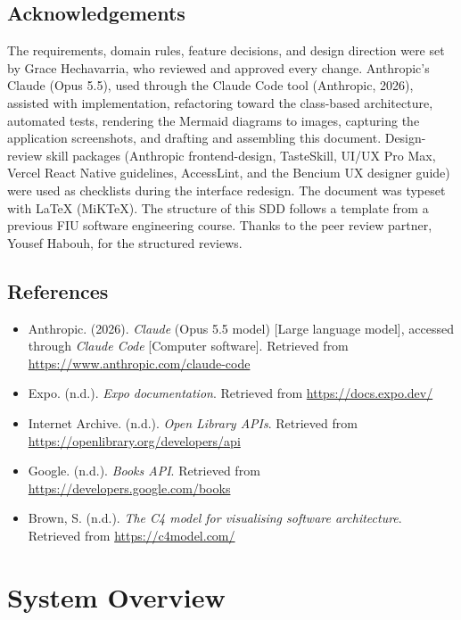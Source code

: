 \documentclass[12pt]{article}
\begin{document}
\subsection{Acknowledgements}

The requirements, domain rules, feature decisions, and design direction were set by Grace Hechavarria, who reviewed and approved every change. Anthropic's Claude (Opus 5.5), used through the Claude Code tool (Anthropic, 2026), assisted with implementation, refactoring toward the class-based architecture, automated tests, rendering the Mermaid diagrams to images, capturing the application screenshots, and drafting and assembling this document. Design-review skill packages (Anthropic frontend-design, TasteSkill, UI/UX Pro Max, Vercel React Native guidelines, AccessLint, and the Bencium UX designer guide) were used as checklists during the interface redesign. The document was typeset with \LaTeX{} (MiKTeX). The structure of this SDD follows a template from a previous FIU software engineering course. Thanks to the peer review partner, Yousef Habouh, for the structured reviews.

\subsection{References}

\begin{itemize}[leftmargin=0.5in, itemindent=-0.5in, labelsep=0in]
\item Anthropic. (2026). \textit{Claude} (Opus 5.5 model) [Large language model], accessed through \textit{Claude Code} [Computer software]. Retrieved from \url{https://www.anthropic.com/claude-code}
\item Expo. (n.d.). \textit{Expo documentation}. Retrieved from \url{https://docs.expo.dev/}
\item Internet Archive. (n.d.). \textit{Open Library APIs}. Retrieved from \url{https://openlibrary.org/developers/api}
\item Google. (n.d.). \textit{Books API}. Retrieved from \url{https://developers.google.com/books}
\item Brown, S. (n.d.). \textit{The C4 model for visualising software architecture}. Retrieved from \url{https://c4model.com/}
\end{itemize}

\section{System Overview}
\end{document}
